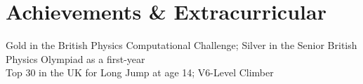 \section{Achievements \& Extracurricular}
\begin{itemize}[leftmargin=0.15in, label={}]
\small{\item{
    {Gold in the British Physics Computational Challenge; Silver in the Senior British Physics Olympiad as a first-year}\\
    {Top 30 in the UK for Long Jump at age 14; V6-Level Climber}
}}
\end{itemize}
